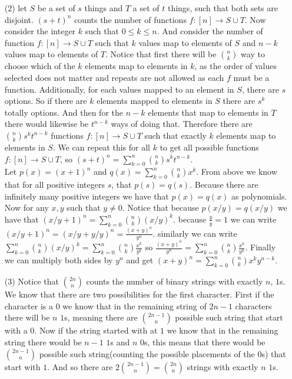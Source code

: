 \documentclass[12pt]{amsart}
\theoremstyle{definition}
\newcommand{\ra}{\rightarrow}
\begin{document}
\begin{itemize}
\item[(2)] %
let $S$ be a set of $s$ things and $T$ a set of $t$ things, such that both sets are disjoint. $(s+t)^n$ counts the number of functions $f:[n]\ra S\cup T$. Now consider the integer $k$ such that $0\leq k\leq n$. And consider the number of function $f:[n]\ra S\cup T$ such that $k$ values map to elements of $S$ and $n-k$ values map to elements of $T$. Notice that first there will be ${n \choose k}$ way to choose which of the $k$ elements map to elements in $k$, as the order of values selected does not matter and repeats are not allowed as each $f$ must be a function. Additionally, for each values mapped to an element in $S$, there are $s$ options. So if there are $k$ elements mapped to elements in $S$ there are $s^k$ totally options. And then for the $n-k$ elements that map to elements in $T$ there would likewise be $t^{n-k}$ ways of doing that. Therefore there are ${n \choose k}s^kt^{n-k}$ functions $f:[n]\ra S\cup T$ such that exactly $k$ elements map to elements in $S$. We can repeat this for all $k$ to get all possible functions $f:[n]\ra S\cup T$, so $(s+t)^n=\sum_{k=0}^n{n \choose k}s^kt^{n-k}$.\\

Let $p(x)=(x+1)^n$ and $q(x)=\sum_{k=0}^{n}{n \choose k}x^k$. From above we know that for all positive integers $s$, that $p(s)=q(s)$. Because there are infinitely many positive integers we have that $p(x)=q(x)$ as polynomials. Now for any $x,y$ such that $y\neq 0$. Notice that because $p(x/y)=q(x/y)$ we have that $(x/y+1)^n=\sum_{k=0}^{n}{n \choose k}(x/y)^k$. because $\frac{y}{y}=1$ we can write $(x/y+1)^n=(x/y+y/y)^n=\frac{(x+y)^n}{y^n}$. similarly we can write $\sum_{k=0}^{n}{n \choose k}(x/y)^k=\sum_{k=0}^{n}{n \choose k}\frac{x^k}{y^k}$ so $\frac{(x+y)^n}{y^n}=\sum_{k=0}^{n}{n \choose k}\frac{x^k}{y^k}$. Finally we can multiply both sides by $y^n$ and get $(x+y)^n=\sum_{k=0}^{n}{n \choose k} x^ky^{n-k}$.\\%

\item[(3)] %
Notice that ${2n \choose n}$ counts the number of binary strings with exactly $n$, $1$s. We know that there are two possibilities for the first character. First if the character is a $0$ we know that in the remaining string of $2n-1$ characters there will be $n$ $1$s, meaning there are ${2n-1\choose n}$ possible such string that start with a $0$. Now if the string started with at $1$ we know that in the remaining string there would be $n-1$ $1$s and $n$ $0$s, this means that there would be ${2n-1 \choose n}$ possible such string(counting the possible placements of the $0$s) that start with $1$. And so there are $2{2n-1\choose n}={2n\choose n}$ strings with exactly $n$ $1$s.\\




\end{itemize}
\end{document}
